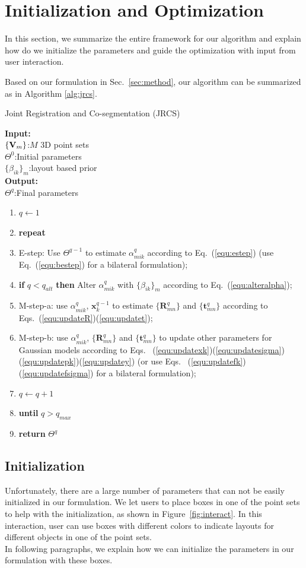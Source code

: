 \section{Initialization and Optimization}
\label{sec:imp}
In this section, we summarize the entire framework for our algorithm and explain how do we initialize the parameters and guide the optimization with input from user interaction.

Based on our formulation in Sec.~\ref{sec:method}, our algorithm can be summarized as in Algorithm \ref{alg:jrcs}.
\begin{algorithm}[htb]
	\caption{Joint Registration and Co-segmentation (JRCS)}
	\label{alg:jrcs}
	\textbf{Input:}~~\\
	$\{\mathbf{V}_m\}$:$M$ 3D point sets\\
	$\Theta^0$:Initial parameters\\
	$\{\beta_{ik}\}_{m}$:layout based prior\\
	\textbf{Output:}~~\\
	$\Theta^q$:Final parameters~~
	\begin{enumerate}
		\item $q\leftarrow1$
		\item \textbf{repeat}
		\item E-step: Use $\Theta^{q-1}$ to estimate $\alpha_{mik}^q$ according to Eq.~(\ref{equ:estep}) (use Eq.~(\ref{equ:bestep}) for a bilateral formulation);
		\item \textbf{if} $q < q_{alt}$ \textbf{then} Alter $\alpha_{mik}^q$ with $\{\beta_{ik}\}_{m}$ according to Eq.~(\ref{equ:alteralpha});
		\item M-step-a: use $\alpha^q_{mik}$, $\mathbf x^{q-1}_k$ to estimate $\{\mathbf{R}_{mn}^q\}$ and $\{\mathbf t_{mn}^q\}$ according to Eqs.~(\ref{equ:updateR})(\ref{equ:updatet});
		\item M-step-b: use $\alpha^q_{mik}$, $\{\mathbf{R}_{mn}^q\}$ and $\{\mathbf{t}_{mn}^q\}$ to update other parameters for Gaussian models according to Eqs.~ (\ref{equ:updatexk})(\ref{equ:updatesigma})(\ref{equ:updatepk})(\ref{equ:updatey})  (or use Eqs.~ (\ref{equ:updatefk})(\ref{equ:updatefsigma}) for a bilateral formulation);
		\item $q \leftarrow q+1$
		\item \textbf{until} $q > q_{max}$
		\item \textbf{return} $\Theta^q$
	\end{enumerate}
\end{algorithm}
\subsection{Initialization}
\label{sec:imp:interact}
Unfortunately, there are a large number of parameters that can not be easily initialized in our formulation. We let users to place boxes in one of the point sets to help with the initialization, as shown in Figure~\ref{fig:interact}. In this interaction, user can use boxes with different colors to indicate layouts for different objects in one of the point sets.\\
In following paragraphs, we explain how we can initialize the parameters in our formulation with these boxes.

